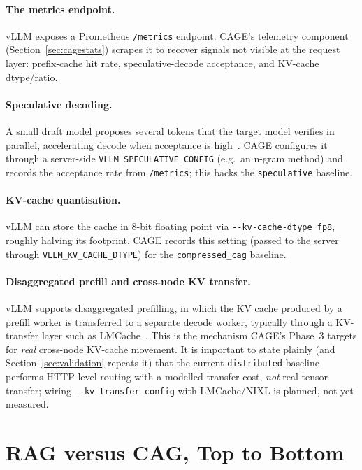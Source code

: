 \documentclass[12pt,a4paper]{article}
\let\cite\citep
\begin{document}
\paragraph{The metrics endpoint.} vLLM exposes a Prometheus \texttt{/metrics}
endpoint. CAGE's telemetry component (Section~\ref{sec:cagestats}) scrapes it to
recover signals not visible at the request layer: prefix-cache hit rate,
speculative-decode acceptance, and KV-cache dtype/ratio.

\paragraph{Speculative decoding.} A small draft model proposes several tokens that
the target model verifies in parallel, accelerating decode when acceptance is
high~\cite{leviathan2023speculative}. CAGE configures it through a server-side
\texttt{VLLM\_SPECULATIVE\_CONFIG} (e.g.\ an n-gram method) and records the
acceptance rate from \texttt{/metrics}; this backs the \texttt{speculative}
baseline.

\paragraph{KV-cache quantisation.} vLLM can store the cache in 8-bit floating point
via \texttt{-{}-kv-cache-dtype fp8}, roughly halving its footprint. CAGE records
this setting (passed to the server through \texttt{VLLM\_KV\_CACHE\_DTYPE}) for the
\texttt{compressed\_cag} baseline.

\paragraph{Disaggregated prefill and cross-node KV transfer.} vLLM supports
disaggregated prefilling, in which the KV cache produced by a prefill worker is
transferred to a separate decode worker, typically through a KV-transfer layer
such as LMCache~\cite{vllm2024disagg, lmcache}. This is the mechanism CAGE's
Phase~3 targets for \emph{real} cross-node KV-cache movement. It is important to
state plainly (and Section~\ref{sec:validation} repeats it) that the current
\texttt{distributed} baseline performs HTTP-level routing with a modelled transfer
cost, \emph{not} real tensor transfer; wiring \texttt{-{}-kv-transfer-config} with
LMCache/NIXL is planned, not yet measured.

\section{RAG versus CAG, Top to Bottom}
\label{sec:ragvscag}
\end{document}
